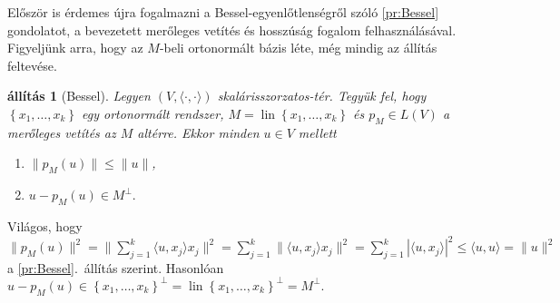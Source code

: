 \documentclass[a4paper, showtrims]{memoir}
\makeatletter
\renewenvironment{proof}[1][\proofname]
    {\par\pushQED{\qed}%
    \normalfont \topsep6\p@\@plus6\p@\relax
    \trivlist
    \item[\hskip\labelsep
        \itshape
    #1\@addpunct{:}]\ignorespaces}
    {\popQED\endtrivlist\@endpefalse}
\theoremstyle{plain}
\newtheorem{proposition}{állítás}[chapter]
\theoremstyle{remark}
\theoremstyle{definition}
\DeclareMathOperator{\lin}{lin}
\newcommand{\ip}[2]{\langle#1,#2\rangle}
\makeatother
\begin{document}
Először is érdemes újra fogalmazni a Bessel-egyenlőtlenségről szóló \ref{pr:Bessel} gondolatot,
a bevezetett merőleges vetítés és hosszúság fogalom felhasználásával.
Figyeljünk arra, hogy az $M$-beli ortonormált bázis léte, még mindig az állítás feltevése.
\begin{proposition}[Bessel]\label{pr:Bessel2}
	Legyen $\left( V,\ip{\cdot}{\cdot} \right)$ skalárisszorzatos-tér.
	Tegyük fel, hogy $\left\{ x_1,\ldots,x_k \right\}$ egy ortonormált rendszer,
	$M=\lin\left\{ x_1,\ldots,x_k \right\}$
	és $p_M\in L\left( V \right)$ a merőleges vetítés az $M$ altérre.
	Ekkor minden $u\in V$ mellett
	\begin{enumerate}
		\item
		      $\|p_M\left( u \right)\|\leq\|u\|$,
		\item
		      \(
		      u-p_M(u)\in M^\perp.
		      \)
		      \qedhere
	\end{enumerate}
\end{proposition}
\begin{proof}
	Világos, hogy
	$
		\|p_M\left( u \right)\|^2
		=
		\|\sum_{j=1}^k\ip{u}{x_j}x_j\|^2
		=
		\sum_{j=1}^k\|\ip{u}{x_j}x_j\|^2
		=
		\sum_{j=1}^k|\ip{u}{x_j}|^2
		\leq
		\ip{u}{u}
		=
		\|u\|^2
	$
	a \ref{pr:Bessel}.~állítás szerint.
	Hasonlóan
	$
		u-p_M\left( u \right)\in \left\{ x_1,\ldots,x_k \right\}^\perp
		=
		\lin\left\{ x_1,\ldots,x_k \right\}^\perp
		=
		M^\perp.
	$
\end{proof}
\end{document}
